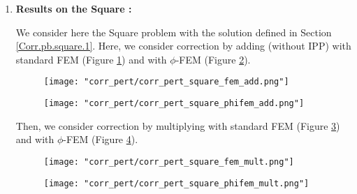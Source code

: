 \begin{enumerate}[label=\textbullet]
	\item \textbf{Results on the Square :}
	
	We consider here the Square problem with the solution defined in Section \ref{Corr.pb.square.1}. Here, we consider correction by adding (without IPP) with standard FEM (Figure \ref{corr_pert_square_fem_add}) and with $\phi$-FEM (Figure \ref{corr_pert_square_phifem_add}).
	
	\begin{minipage}{0.48\linewidth}
		\begin{figure}[H]
			\centering
			\texttt{[image: "corr\_pert/corr\_pert\_square\_fem\_add.png"]}
			\label{corr_pert_square_fem_add}
		\end{figure} 
	\end{minipage}
	\begin{minipage}{0.48\linewidth}
		\begin{figure}[H]
			\centering
			\texttt{[image: "corr\_pert/corr\_pert\_square\_phifem\_add.png"]}
			\label{corr_pert_square_phifem_add}
		\end{figure} 
	\end{minipage}
	
	Then, we consider correction by multiplying with standard FEM (Figure \ref{corr_pert_square_fem_mult}) and with $\phi$-FEM (Figure \ref{corr_pert_square_phifem_mult}).
	
	\begin{minipage}{0.48\linewidth}
		\begin{figure}[H]
			\centering
			\texttt{[image: "corr\_pert/corr\_pert\_square\_fem\_mult.png"]}
			\label{corr_pert_square_fem_mult}
		\end{figure} 
	\end{minipage}
	\begin{minipage}{0.48\linewidth}
		\begin{figure}[H]
			\centering
			\texttt{[image: "corr\_pert/corr\_pert\_square\_phifem\_mult.png"]}
			\label{corr_pert_square_phifem_mult}
		\end{figure} 
	\end{minipage}
\end{enumerate}

